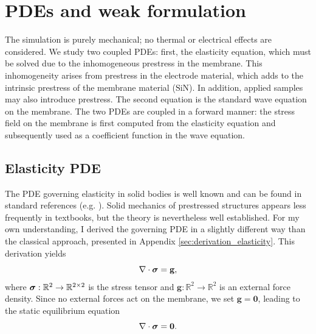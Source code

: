 \section{PDEs and weak formulation}
The simulation is purely mechanical; no thermal or electrical effects are considered. We study two coupled PDEs: first, the elasticity equation, which must be solved due to the inhomogeneous prestress in the membrane. This inhomogeneity arises from prestress in the electrode material, which adds to the intrinsic prestress of the membrane material ($\mathrm{SiN}$). In addition, applied samples may also introduce prestress. The second equation is the standard wave equation on the membrane. The two PDEs are coupled in a forward manner: the stress field on the membrane is first computed from the elasticity equation and subsequently used as a coefficient function in the wave equation. \\

\subsection{Elasticity PDE}
\label{sec:ela_pde}
The PDE governing elasticity in solid bodies is well known and can be found in standard references (e.g. \cite{fung2001classical}). Solid mechanics of prestressed structures appears less frequently in textbooks, but the theory is nevertheless well established. For my own understanding, I derived the governing PDE in a slightly different way than the classical approach, presented in Appendix \ref{sec:derivation_elasticity}. This derivation yields
\begin{equation}
    \nabla \cdot \boldsymbol{\sigma} = \mathbf{g},
    \label{eq:solid_mechanics}
\end{equation}
where $\boldsymbol{\sigma}:\mathbb{R}^2 \rightarrow \mathbb{R}^{2\times 2}$ is the stress tensor and $\mathbf{g}:\mathbb{R}^2 \rightarrow \mathbb{R}^2$ is an external force density. Since no external forces act on the membrane, we set $\mathbf{g}=\mathbf{0}$, leading to the static equilibrium equation
\begin{equation}
    \nabla \cdot \boldsymbol{\sigma} = \mathbf{0}.
    \label{eq:statics}
\end{equation}


